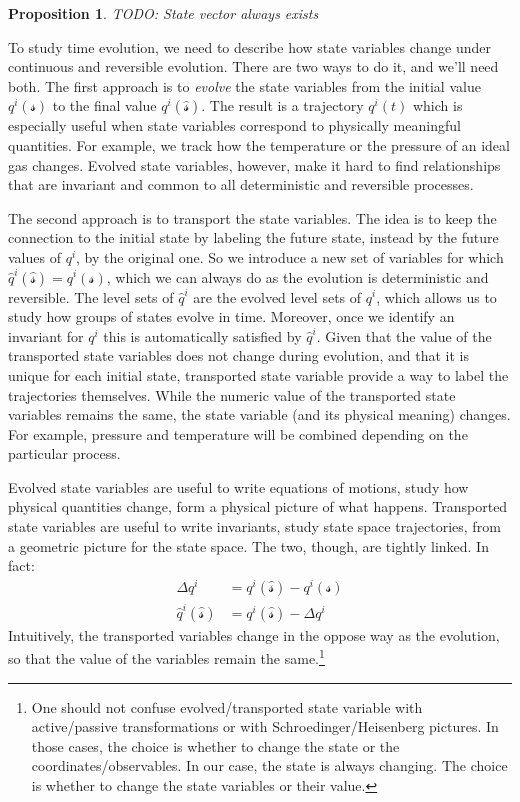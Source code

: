\documentclass[aps,pra,10pt,twocolumn,floatfix,nofootinbib]{revtex4-1}
\newtheorem{prop}{Proposition}[section]
\theoremstyle{definition}
\begin{document}
\begin{prop}\label{state_vector}
TODO: State vector always exists
\end{prop}

To study time evolution, we need to describe how state variables change under continuous and reversible evolution. There are two ways to do it, and we'll need both. The first approach is to \emph{evolve} the state variables from the initial value $q^i(\mathcal{s})$ to the final value $q^i(\hat{\mathcal{s}})$. The result is a trajectory $q^i(t)$ which is especially useful when state variables correspond to physically meaningful quantities. For example, we track how the temperature or the pressure of an ideal gas changes. Evolved state variables, however, make it hard to find relationships that are invariant and common to all deterministic and reversible processes.

The second approach is to transport the state variables. The idea is to keep the connection to the initial state by labeling the future state, instead by the future values of $q^i$, by the original one. So we introduce a new set of variables for which $\hat{q}^i(\hat{\mathcal{s}})=q^i(\mathcal{s})$, which we can always do as the evolution is deterministic and reversible. The level sets of $\hat{q}^i$ are the evolved level sets of $q^i$, which allows us to study how groups of states evolve in time. Moreover, once we identify an invariant for $q^i$ this is automatically satisfied by $\hat{q}^i$. Given that the value of the transported state variables does not change during evolution, and that it is unique for each initial state, transported state variable provide a way to label the trajectories themselves. While the numeric value of the transported state variables remains the same, the state variable (and its physical meaning) changes. For example, pressure and temperature will be combined depending on the particular process.

Evolved state variables are useful to write equations of motions, study how physical quantities change, form a physical picture of what happens. Transported state variables are useful to write invariants, study state space trajectories, from a geometric picture for the state space. The two, though, are tightly linked. In fact:
\begin{align*}
\Delta q^i &= q^i(\hat{\mathcal{s}}) - q^i(\mathcal{s}) \\
\hat{q}^i(\hat{\mathcal{s}}) &= q^i(\hat{\mathcal{s}}) - \Delta q^i
\end{align*}
Intuitively, the transported variables change in the oppose way as the evolution, so that the value of the variables remain the same.\footnote{One should not confuse evolved/transported state variable with active/passive transformations or with Schroedinger/Heisenberg pictures. In those cases, the choice is whether to change the state or the coordinates/observables. In our case, the state is always changing. The choice is whether to change the state variables or their value.}
\end{document}
